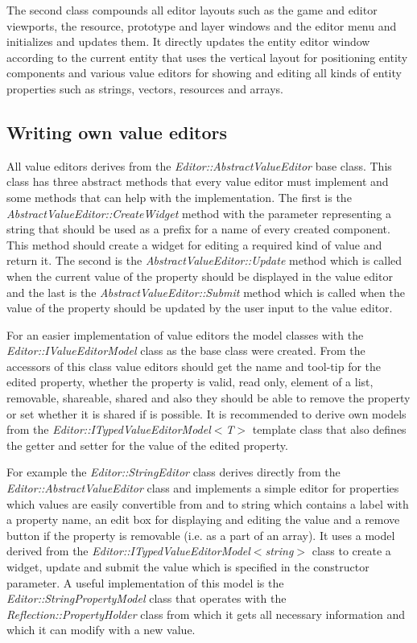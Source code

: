 The second class compounds all editor layouts such as the game and editor viewports, the resource, prototype and layer windows and the editor menu and initializes and updates them. It directly updates the entity editor window according to the current entity that uses the vertical layout for positioning entity components and various value editors for showing and editing all kinds of entity properties such as strings, vectors, resources and arrays.

\subsection{Writing own value editors}

All value editors derives from the \emph{Editor::AbstractValueEditor} base class. This class has three abstract methods that every value editor must implement and some methods that can help with the implementation. The first is the \emph{AbstractValueEditor::CreateWidget} method with the parameter representing a string that should be used as a prefix for a name of every created component. This method should create a widget for editing a required kind of value and return it. The second is the \emph{AbstractValueEditor::Update} method which is called when the current value of the property should be displayed in the value editor and the last is the \emph{AbstractValueEditor::Submit} method which is called when the value of the property should be updated by the user input to the value editor.

For an easier implementation of value editors the model classes with the \emph{Editor::IValueEditorModel} class as the base class were created. From the accessors of this class value editors should get the name and tool-tip for the edited property, whether the property is valid, read only, element of a list, removable, shareable, shared and also they should be able to remove the property or set whether it is shared if is possible. It is recommended to derive own models from the \emph{Editor::ITypedValueEditor\-Model$<$T$>$} template class that also defines the getter and setter for the value of the edited property.

For example the \emph{Editor::StringEditor} class derives directly from the \emph{Editor::AbstractValueEditor} class and implements a simple editor for properties which values are easily convertible from and to string which contains a label with a property name, an edit box for displaying and editing the value and a remove button if the property is removable (i.e. as a part of an array). It uses a model derived from the \emph{Editor::ITypedValueEditorModel$<$string$>$} class to create a widget, update and submit the value which is specified in the constructor parameter. A useful implementation of this model is the \emph{Editor::StringPropertyModel} class that operates with the \emph{Reflection::Property\-Holder} class from which it gets all necessary information and which it can modify with a new value.

